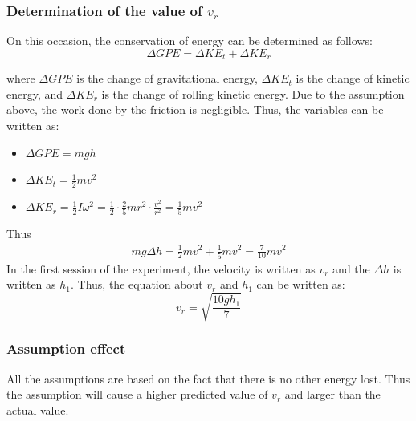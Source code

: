 \documentclass{article}
\begin{document}
    
        \subsubsection{Determination of the value of $v_r$}
            On this occasion, the conservation of energy can be determined as follows:
            \begin{equation}
                \Delta GPE = \Delta KE_t + \Delta KE_r \nonumber
            \end{equation}

        where $\Delta GPE$ is the change of gravitational energy, $\Delta KE_t$ is the change of kinetic energy, and $\Delta KE_r$ is the change of rolling kinetic energy. Due to the assumption above, the work done by the friction is negligible. Thus, the variables can be written as:
        \begin{itemize}
            \item $\Delta GPE = mgh$ 
            \item $\Delta KE_t = \frac{1}{2}mv^2$ 
            \item $\Delta KE_r = \frac{1}{2}I\omega^2 = \frac{1}{2}\cdot \frac{2}{5}mr^2\cdot\frac{v^2}{r^2} = \frac{1}{5}mv^2$ 
        \end{itemize}
        Thus 
        \begin{equation}
            \begin{aligned}
                mg\Delta h = \frac{1}{2}mv^2 + \frac{1}{5}mv^2 = \frac{7}{10}mv^2 \nonumber
            \end{aligned}
        \end{equation}
        In the first session of the experiment, the velocity is written as $v_r$ and the $\Delta h$ is written as $h_1$. Thus, the equation about $v_r$ and $h_1$ can be written as:
        \begin{equation}\label{vr}
            v_r = \sqrt{\frac{10gh_1}{7}}
        \end{equation}
        \subsubsection{Assumption effect}
            All the assumptions are based on the fact that there is no other energy lost. Thus the assumption will cause a higher predicted value of $v_r$ and larger than the actual value.
\end{document}

